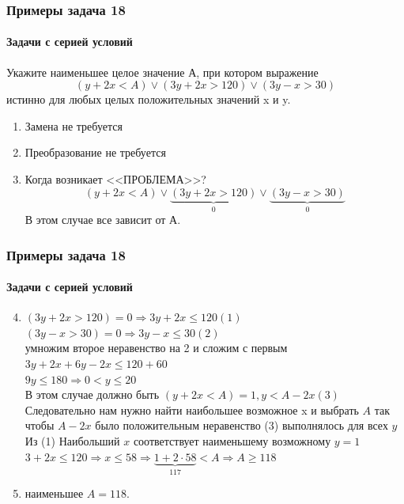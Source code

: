 \begin{frame}[t]
\frametitle{Примеры задача 18}
\framesubtitle{Задачи с серией условий}

Укажите наименьшее целое значение А, при котором выражение
$$(y + 2x < A) \vee (3y + 2x > 120) \vee (3y - x > 30)$$
истинно для любых целых положительных значений x и y.

	\begin{enumerate}
		\item Замена не требуется 	\pause 
		\item Преобразование не требуется 	\pause 
		\item Когда возникает <<ПРОБЛЕМА>>? 	\pause 
		$$(y + 2x < A) \vee \underbrace{(3y + 2x > 120)}_{0} \vee \underbrace{(3y - x > 30)}_{0}$$
		В этом случае все зависит от А.
		
		
	\end{enumerate}
	
	
\end{frame}

\begin{frame}[t]
\frametitle{Примеры задача 18}
\framesubtitle{Задачи с серией условий}
\begin{enumerate}
		\setcounter{enumi}{3}
		\item $(3y + 2x > 120)=0 \Rightarrow 3y + 2x \leq 120 (1)$\\  	\pause 
		      $(3y - x > 30)=0 \Rightarrow 3y - x \leq 30 (2)$\\ 
					умножим второе неравенство на 2 и сложим с первым \\
					$3y+2x+6y-2x \leq 120+60$\\
					$9y \leq 180 \Rightarrow 0 < y \leq 20 $\\
					В этом случае должно быть $(y + 2x < A)=1, y < A-2x (3)$\\ 	\pause 
					Следовательно нам нужно найти наибольшее возможное x и выбрать $A$ так чтобы $A-2x$ было положительным неравенство (3) выполнялось для всех $y$\\ 	\pause 
					Из (1) Наибольший $x$ соответствует наименьшему возможному $y=1$\\
					$3+2x\leq 120 \Rightarrow x \leq 58 \Rightarrow \underbrace{1+2\cdot 58}_{117} < A \Rightarrow A \geq 118$\\ 	\pause 
	 \item наименьшее $A=118$.
		
	\end{enumerate}
	
	
	
\end{frame}

